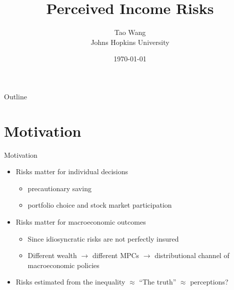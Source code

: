 \documentclass{beamer}
\title{Perceived Income Risks}
\author{Tao Wang \\ Johns Hopkins University}
\date{\today}
\begin{document}
	

\begin{frame}
	\titlepage
\end{frame}
\begin{frame}{Outline}
	\tableofcontents
\end{frame}


\section{Motivation}

\begin{frame}{Motivation}
	\begin{itemize}
		\item Risks matter for individual decisions
		\begin{itemize}
			\item precautionary saving
			\item portfolio choice and stock market participation
		\end{itemize} 
		\item Risks matter for macroeconomic outcomes
		\begin{itemize}
			\item Since idiosyncratic risks are not perfectly insured 
			\item Different wealth $\rightarrow$ different MPCs $\rightarrow$ distributional channel of macroeconomic policies 
		\end{itemize}  %
		\item Risks estimated from the inequality $\approx$  ``The truth''  $\approx$ perceptions? %
	\end{itemize}
\end{frame}
\end{document}
